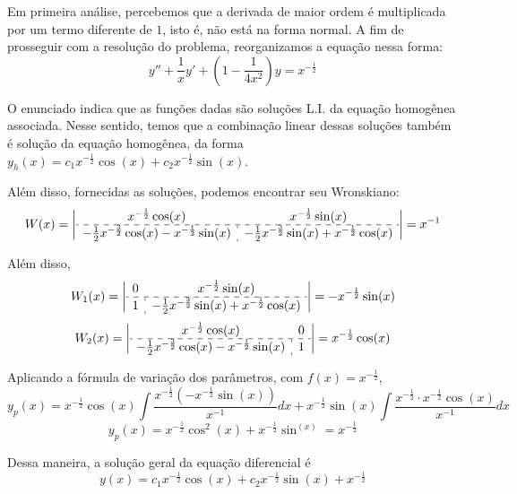 \documentclass[oneside,12pt,a4paper]{report}
\begin{document}
\begin{resolucao}
    Em primeira análise, percebemos que a derivada de maior ordem é multiplicada por um termo diferente de $1$, isto é, não está na forma normal. A fim de prosseguir com a resolução do problema, reorganizamos a equação nessa forma:
    \[y''+\frac{1}{x}y'+\left(1-\frac{1}{4x^2}\right)y=x^{-\frac{1}{2}}\]

    O enunciado indica que as funções dadas são soluções L.I. da equação homogênea associada. Nesse sentido, temos que a combinação linear dessas soluções também é solução da equação homogênea, da forma $y_h(x)=c_1x^{-\frac{1}{2}}\cos(x)+c_2x^{-\frac{1}{2}}\sin(x)$.

    Além disso, fornecidas as soluções, podemos encontrar seu Wronskiano:
    \[W(x)=\left|\begin{array}{c:c}
       x^{-\frac{1}{2}}\cos(x) & x^{-\frac{1}{2}}\sin(x)\\ \hdashline
       -\frac{1}{2}x^{-\frac{3}{2}}\cos(x)-x^{-\frac{1}{2}}\sin(x) & -\frac{1}{2}x^{-\frac{3}{2}}\sin(x)+x^{-\frac{1}{2}}\cos(x)
    \end{array}\right|=x^{-1}\]

    Além disso,
    \[W_1(x)=\left|\begin{array}{c:c}
        0 & x^{-\frac{1}{2}}\sin(x)\\ \hdashline
        1 & -\frac{1}{2}x^{-\frac{3}{2}}\sin(x)+x^{-\frac{1}{2}}\cos(x)
    \end{array}\right|=-x^{-\frac{1}{2}}\sin(x)\]
    \[W_2(x)=\left|\begin{array}{c:c}
        x^{-\frac{1}{2}}\cos(x)  & 0\\ \hdashline
        -\frac{1}{2}x^{-\frac{3}{2}}\cos(x)-x^{-\frac{1}{2}}\sin(x) & 1
    \end{array}\right|=x^{-\frac{1}{2}}\cos(x)\]

    Aplicando a fórmula de variação dos parâmetros, com $f(x)=x^{-\frac{1}{2}}$,
    \[y_p(x)=x^{-\frac{1}{2}}\cos(x)\int\frac{x^{-\frac{1}{2}}(-x^{-\frac{1}{2}}\sin(x))}{x^{-1}}dx+x^{-\frac{1}{2}}\sin(x)\int\frac{x^{-\frac{1}{2}}\cdot x^{-\frac{1}{2}}\cos(x)}{x^{-1}}dx\]
    \[y_p(x)=x^{-\frac{1}{2}}\cos^2(x)+x^{-\frac{1}{2}}\sin^(x)=x^{-\frac{1}{2}}\]

    Dessa maneira, a solução geral da equação diferencial é
    \[\boxed{y(x)=c_1x^{-\frac{1}{2}}\cos(x)+c_2x^{-\frac{1}{2}}\sin(x)+x^{-\frac{1}{2}}}\]

\end{resolucao}
\end{document}
